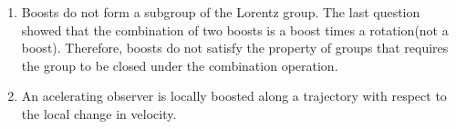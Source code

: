 \documentclass[12pt,a4]{article}
\begin{document}
\begin{enumerate}
\begin{enumerate}
\begin{align*}
\begin{matrix}
          1            &0                               &0                               &0                                \\
          0            &0                               &0                               &0
          \end{matrix}
          \right)
          -\frac{\gamma-1}{v^2} v \delta v_\perp
          \left(
          \begin{matrix}
          0            & 0                              &0                               &0                                \\
          0            & 0                              &-1                              &0                                \\
          0            & 1                              &0                               &0                                \\
          0            &0                               &0                               &0
          \end{matrix}
          \right)\\
          &=
          I 
          -(\gamma^2\delta v_\parallel/c) K_1
          -(\gamma \delta  v_\perp /c) K_2
          -\frac{\gamma-1}{v^2} v \delta v_\perp K_3\\
          &=
          I 
          -\delta \boldsymbol{\psi}'\cdot \mathbf{K}
          -\delta \boldsymbol{\theta}\cdot \mathbf{J}
        \end{align*}
        Since $\boldsymbol{\theta}$ only has a component in the third index:
        \begin{align*}
          \delta \boldsymbol{\theta} = \frac{\gamma-1}{v^2} \mathbf{v} \times \mathbf{\delta v}_\perp = \frac{\gamma^2-1}{(1 +\gamma)v^2 /c^2}\frac{1}{c^2} \mathbf{v} \times \mathbf{\delta v} = \frac{\frac{v^2/c^2}{1- v^2 / c^2}}{(1 +\gamma )v^2 /c^2}\frac{1}{c^2} \mathbf{v} \times \mathbf{\delta v} = \frac{1}{c^2}\frac{\gamma^2}{1 +\gamma } \mathbf{v} \times \mathbf{\delta v}
        \end{align*}
      \item
        Boosts do not form a subgroup of the Lorentz group.
        The last question showed that the combination of two boosts is a boost times a rotation(not a boost).
        Therefore, boosts do not satisfy the property of groups that requires the group to be closed under the combination operation.
      \item
        An acelerating observer is locally boosted along a trajectory with respect to the local change in velocity.

\end{enumerate}
\end{enumerate}
\end{document}
